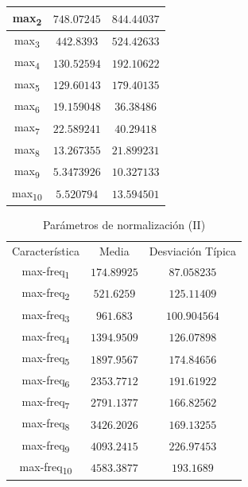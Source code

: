 \documentclass[12pt]{article}
\begin{document}
\begin{table}[!ht]
\begin{tabular}{||c c c||}
			\hline
			max\textsubscript{2} & $748.07245$ & $844.44037$ \\
			\hline
			max\textsubscript{3} & $442.8393$ & $524.42633$ \\
			\hline
			max\textsubscript{4} & $130.52594$ & $192.10622$ \\
			\hline
			max\textsubscript{5} & $129.60143$ & $179.40135$ \\
			\hline
			max\textsubscript{6} & $19.159048$ & $36.38486$ \\
			\hline
			max\textsubscript{7} & $22.589241$ & $40.29418$ \\
			\hline
			max\textsubscript{8} & $13.267355$ & $21.899231$ \\
			\hline
			max\textsubscript{9} & $5.3473926$ & $10.327133$ \\
			\hline
			max\textsubscript{10} & $5.520794$ & $13.594501$ \\
			\hline
		\end{tabular}
	\label{Tab:Features_2_1}
\end{table}

\begin{table}[!ht]
	\caption{Parámetros de normalización (II)}
	\centering
		\begin{tabular}{||c c c||}
			\hline
			Característica & Media & Desviación Típica  \\ [0.5ex]
			max-freq\textsubscript{1} & $174.89925$ & $87.058235$ \\
			\hline
			max-freq\textsubscript{2} & $521.6259$ & $125.11409$ \\
			\hline
			max-freq\textsubscript{3} & $961.683$ & $100.904564$ \\
			\hline
			max-freq\textsubscript{4} & $1394.9509$ & $126.07898$ \\
			\hline
			max-freq\textsubscript{5} & $1897.9567$ & $174.84656$ \\
			\hline
			max-freq\textsubscript{6} & $2353.7712$ & $191.61922$ \\
			\hline
			max-freq\textsubscript{7} & $2791.1377$ & $166.82562$ \\
			\hline
			max-freq\textsubscript{8} & $3426.2026$ & $169.13255$ \\
			\hline
			max-freq\textsubscript{9} & $4093.2415$ & $226.97453$ \\
			\hline
			max-freq\textsubscript{10} & $4583.3877$ & $193.1689$ \\
			\hline
		\end{tabular}
	\label{Tab:Features_2_2}
\end{table}
\end{document}
